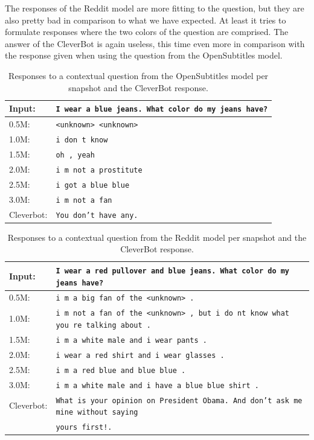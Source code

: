 The responses of the Reddit model are more fitting to the question, but they are also pretty bad in comparison to what we have expected. At least it tries to formulate responses where the two colors of the question are comprised. The answer of the CleverBot is again useless, this time even more in comparison with the response given when using the question from the OpenSubtitles model.
\\
\begin{table}[H]
	\centering
	\begin{adjustbox}{max width=\textwidth}
		\begin{tabular}{ll}
			\toprule
			Input: 	& \texttt{I wear a blue jeans. What color do my jeans have?}\\
			\midrule
			0.5M: 	& \texttt{<unknown> <unknown>}\\
			1.0M: 	& \texttt{i don t know}\\
			1.5M:	& \texttt{oh , yeah}\\
			2.0M:	& \texttt{i m not a prostitute}\\
			2.5M:	& \texttt{i got a blue blue}\\
			3.0M:	& \texttt{i m not a fan}\\
			Cleverbot:	& \texttt{You don't have any.}\\
			\bottomrule
		\end{tabular}
	\end{adjustbox}
	\caption{Responses to a contextual question from the OpenSubtitles model per snapshot and the CleverBot response.}
	\label{results:example4_output:OpenSubtitle_compared}
\end{table}
\begin{table}[H]
	\centering
	\begin{adjustbox}{max width=\textwidth}
		\begin{tabular}{ll}
			\toprule
			Input: 	& \texttt{I wear a red pullover and blue jeans. What color do my jeans have?}\\
			\midrule
			0.5M: 	& \texttt{i m a big fan of the <unknown> .}\\
			1.0M: 	& \texttt{i m not a fan of the <unknown> , but i do nt know what you re talking about .}\\
			1.5M:	& \texttt{i m a white male and i wear pants .}\\
			2.0M:	& \texttt{i wear a red shirt and i wear glasses .}\\
			2.5M:	& \texttt{i m a red blue and blue blue .}\\
			3.0M:	& \texttt{i m a white male and i have a blue blue shirt .}\\
			Cleverbot:	& \texttt{What is your opinion on President Obama. And don't ask me mine without saying}\\
			& \texttt{yours first!.}\\
			\bottomrule
		\end{tabular}
	\end{adjustbox}
	\caption{Responses to a contextual question from the Reddit model per snapshot and the CleverBot response.}
	\label{results:example4_output:Reddit_compared}
\end{table}

